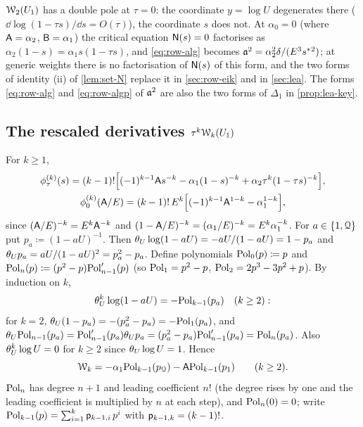 \begin{rmk}
\label{rmk:row-hessfib}
$\mathcal{W}_2(U_1)$ has a double pole at $\tau=0$: the coordinate $y=\log U$ degenerates there ($\dd\log(1-\tau s)/\dd s=O(\tau)$), the coordinate $s$ does not. At $\alpha_0=0$ (where $\mathsf{A}=\alpha_2$, $\mathsf{B}=\alpha_1$) the critical equation $\mathsf{N}(s)=0$ factorises as $\alpha_2(1-s)=\alpha_1s(1-\tau s)$, and \eqref{eq:row-alg} becomes $\mathfrak{a}^2=\alpha_2^2\delta/(E^3s^{\ast}{}^2)$; at generic weights there is no factorisation of $\mathsf{N}(s)$ of this form, and the two forms of identity (ii) of \cref{lem:set-N} replace it in \cref{sec:row-eik} and in \cref{sec:lea}. The forms \eqref{eq:row-alg} and \eqref{eq:row-algp} of $\mathfrak{a}^2$ are also the two forms of $\Delta_1$ in \cref{prop:lea-key}.
\end{rmk}

\subsection{The rescaled derivatives \texorpdfstring{$\tau^k\mathcal{W}_k(U_1)$}{tau\textasciicircum k W\_k(U\_1)}}
\label{sec:row-wr}

For $k\geq1$,
\begin{equation}
\label{eq:row-phik}
\begin{gathered}
\phi_\tau^{(k)}(s)=(k-1)!\Big[(-1)^{k-1}\mathsf{A} s^{-k}-\alpha_1(1-s)^{-k}+\alpha_2\tau^k(1-\tau s)^{-k}\Big],\\
\phi_0^{(k)}(\mathsf{A}/E)=(k-1)!\,E^k\Big[(-1)^{k-1}\mathsf{A}^{1-k}-\alpha_1^{1-k}\Big],
\end{gathered}
\end{equation}
since $(\mathsf{A}/E)^{-k}=E^k\mathsf{A}^{-k}$ and $(1-\mathsf{A}/E)^{-k}=(\alpha_1/E)^{-k}=E^k\alpha_1^{-k}$. For $a\in\{1,\mathcal{Q}\}$ put $p_a\coloneqq(1-aU)^{-1}$. Then $\theta_{U}\log(1-aU)=-aU/(1-aU)=1-p_a$ and $\theta_{U} p_a=aU/(1-aU)^2=p_a^2-p_a$. Define polynomials $\mathrm{Pol}_0(p)\coloneqq p$ and $\mathrm{Pol}_n(p)\coloneqq(p^2-p)\mathrm{Pol}_{n-1}'(p)$ (so $\mathrm{Pol}_1=p^2-p$, $\mathrm{Pol}_2=2p^3-3p^2+p$). By induction on $k$,
\[
\theta_{U}^k\log(1-aU)=-\mathrm{Pol}_{k-1}(p_a)\quad(k\geq2):
\]
for $k=2$, $\theta_{U}(1-p_a)=-(p_a^2-p_a)=-\mathrm{Pol}_1(p_a)$, and $\theta_{U}\mathrm{Pol}_{n-1}(p_a)=\mathrm{Pol}_{n-1}'(p_a)\theta_{U} p_a=(p_a^2-p_a)\mathrm{Pol}_{n-1}'(p_a)=\mathrm{Pol}_n(p_a)$. Also $\theta_{U}^k\log U=0$ for $k\geq2$ since $\theta_{U}\log U=1$. Hence
\begin{equation}
\label{eq:row-Wk}
\mathcal{W}_k=-\alpha_1\mathrm{Pol}_{k-1}(p_{\mathcal{Q}})-\mathsf{A}\mathrm{Pol}_{k-1}(p_1)\qquad(k\geq2).
\end{equation}
$\mathrm{Pol}_n$ has degree $n+1$ and leading coefficient $n!$ (the degree rises by one and the leading coefficient is multiplied by $n$ at each step), and $\mathrm{Pol}_n(0)=0$; write $\mathrm{Pol}_{k-1}(p)=\sum_{i=1}^{k}\mathsf{p}_{k-1,i}\,p^i$ with $\mathsf{p}_{k-1,k}=(k-1)!$.

